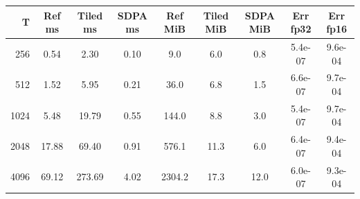 \begin{tabular}{rcccccccc}
\hline
T & Ref ms & Tiled ms & SDPA ms & Ref MiB & Tiled MiB & SDPA MiB & Err fp32 & Err fp16 \\
\hline
256 & 0.54 & 2.30 & 0.10 & 9.0 & 6.0 & 0.8 & 5.4e-07 & 9.6e-04 \\
512 & 1.52 & 5.95 & 0.21 & 36.0 & 6.8 & 1.5 & 6.6e-07 & 9.7e-04 \\
1024 & 5.48 & 19.79 & 0.55 & 144.0 & 8.8 & 3.0 & 5.4e-07 & 9.7e-04 \\
2048 & 17.88 & 69.40 & 0.91 & 576.1 & 11.3 & 6.0 & 6.4e-07 & 9.4e-04 \\
4096 & 69.12 & 273.69 & 4.02 & 2304.2 & 17.3 & 12.0 & 6.0e-07 & 9.3e-04 \\
\hline
\end{tabular}
